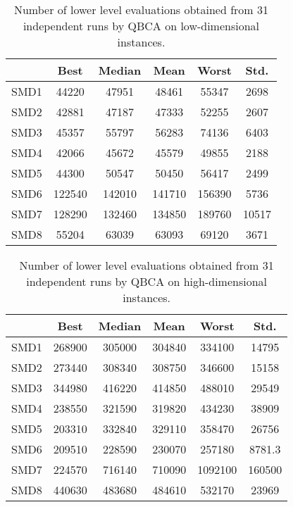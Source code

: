 \documentclass[conference]{IEEEtran}
\theoremstyle{definition}
\begin{document}
\begin{table}[htbp]
    \caption{Number of lower level evaluations obtained from 31 independent runs by QBCA on low-dimensional instances.}
    \label{tab:ll-evals-5}
    \centering
    \begin{tabular}{cccccc}
        \hline
            & Best &  Median &  Mean &  Worst &  Std. \\ \hline
        SMD1 & 44220 & 47951 & 48461 & 55347 & 2698 \\ \hline 
        SMD2 & 42881 & 47187 & 47333 & 52255 & 2607 \\ \hline 
        SMD3 & 45357 & 55797 & 56283 & 74136 & 6403 \\ \hline 
        SMD4 & 42066 & 45672 & 45579 & 49855 & 2188 \\ \hline 
        SMD5 & 44300 & 50547 & 50450 & 56417 & 2499 \\ \hline 
        SMD6 & 122540 & 142010 & 141710 & 156390 & 5736 \\ \hline 
        SMD7 & 128290 & 132460 & 134850 & 189760 & 10517 \\ \hline 
        SMD8 & 55204 & 63039 & 63093 & 69120 & 3671 \\ \hline 
    \end{tabular}
\end{table}
\begin{table}[htbp]
    \caption{Number of lower level evaluations obtained from 31 independent runs by QBCA on high-dimensional instances.}
    \label{tab:ll-evals}
    \centering
    \begin{tabular}{cccccc}
        \hline
        & Best &  Median &  Mean &  Worst &  Std. \\ \hline
        SMD1 & 268900 & 305000 & 304840 & 334100 & 14795 \\ \hline 
        SMD2 & 273440 & 308340 & 308750 & 346600 & 15158 \\ \hline 
        SMD3 & 344980 & 416220 & 414850 & 488010 & 29549 \\ \hline 
        SMD4 & 238550 & 321590 & 319820 & 434230 & 38909 \\ \hline 
        SMD5 & 203310 & 332840 & 329110 & 358470 & 26756 \\ \hline 
        SMD6 & 209510 & 228590 & 230070 & 257180 & 8781.3 \\ \hline 
        SMD7 & 224570 & 716140 & 710090 & 1092100 & 160500 \\ \hline 
        SMD8 & 440630 & 483680 & 484610 & 532170 & 23969 \\ \hline 
    \end{tabular}
\end{table}
\end{document}
